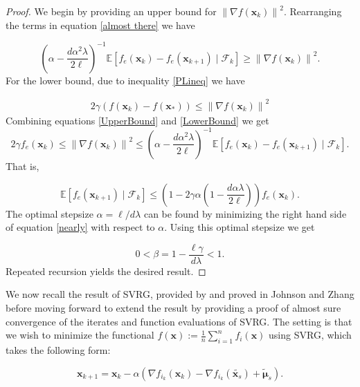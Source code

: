 \documentclass[11pt] {article}
\newcommand{\norm}[1]{\left\lVert#1\right\rVert}
\newcommand{\x}{\pmb{x}}
\newcommand{\Expectation}{\mathbb{E}}
\begin{document}
\begin{proof}
 We begin by providing an upper bound for $\norm{\nabla f(\x_k)}^2$. Rearranging the terms in equation \eqref{almost there} we have

\begin{equation} \label{UpperBound}
 \left(\alpha -\frac{d\alpha^2\lambda}{2\ell}\right) ^{-1}\Expectation \left[f_e(\x_k) - f_e(\x_{k+1})\mid \mathcal{F}_k \right] \geq \norm{\nabla f(\x_k)}^2.
\end{equation}
%
%
For the lower bound, due to inequality \eqref{PLineq} we have 

\begin{align}\label{LowerBound}
2\gamma	\left(f(\x_k) - f(\x_*)\right) \leq \norm{\nabla f(\x_k)}^2
\end{align}
%
Combining equations \eqref{UpperBound} and \eqref{LowerBound} we get
%
\begin{equation*}
2\gamma f_e(\x_k) \leq \norm{\nabla f(\x_k)}^2 \leq \left( \alpha - \frac{d \alpha^2 \lambda}{2\ell}\right)^{-1} \Expectation\left[f_e(\x_{k}) - f_e(\x_{k+1}) \mid \mathcal{F}_k\right].
\end{equation*}
%
That is,

\begin{equation}\label{nearly}
\Expectation \left[f_e(\x_{k+1}) \mid \mathcal{F}_k\right] \leq \left(1-2\gamma\alpha\left(1-\frac{d\alpha\lambda}{2\ell}\right)\right)f_e(\x_k).
\end{equation}
%
The optimal stepsize  $\alpha=\ell/d \lambda$ can be found by minimizing the right hand side of equation \eqref{nearly} with respect to $\alpha$. Using this optimal stepsize we get

\begin{equation*}
0 < \beta = 1 - \frac{\ell \gamma}{d \lambda } < 1.
\end{equation*}
%
Repeated recursion yields the desired result.

\end{proof}
%
%
%
%
We now recall the result of SVRG, provided by and proved in Johnson and Zhang \cite{SVRG} before moving forward to extend the result by providing a proof of almost sure convergence of the iterates and function evaluations of SVRG. The setting is that we wish to minimize the functional $f(\x):=\frac{1}{n}\sum_{i=1}^n f_i(\x)$ using SVRG, which takes the following form:


\begin{equation*}
\x_{k+1} = \x_k - \alpha \left(\nabla f_{i_k}(\x_{k}) - \nabla f_{i_k}(\tilde{\x_s}) + \tilde{\pmb{\mu}}_s\right).
\end{equation*}
\end{document}
